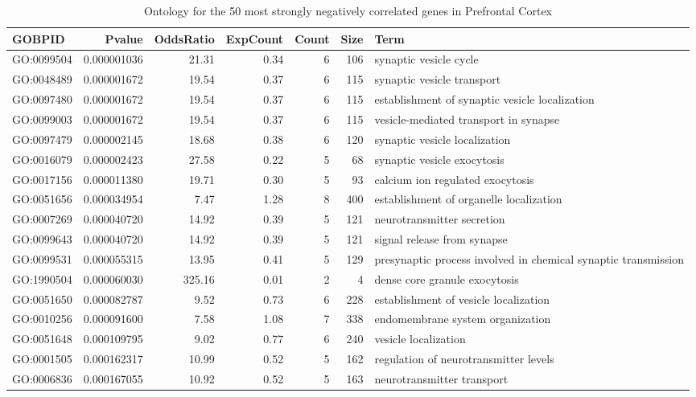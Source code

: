 \documentclass[letterpaper,12pt]{article}
\numberwithin{equation}{appendix}
\begin{document}
\noindent

\begin{landscape}
{\small {

\begin{longtable}{lrrrrrl}
\caption{Ontology for the 50 most strongly negatively correlated genes in Prefrontal Cortex} \\ 
  \toprule
GOBPID & Pvalue & OddsRatio & ExpCount & Count & Size & Term \\ 
  \midrule
GO:0099504 & 0.000001036 & 21.31 & 0.34 & 6 & 106 & synaptic vesicle cycle \\ 
  GO:0048489 & 0.000001672 & 19.54 & 0.37 & 6 & 115 & synaptic vesicle transport \\ 
  GO:0097480 & 0.000001672 & 19.54 & 0.37 & 6 & 115 & establishment of synaptic vesicle localization \\ 
  GO:0099003 & 0.000001672 & 19.54 & 0.37 & 6 & 115 & vesicle-mediated transport in synapse \\ 
  GO:0097479 & 0.000002145 & 18.68 & 0.38 & 6 & 120 & synaptic vesicle localization \\ 
  GO:0016079 & 0.000002423 & 27.58 & 0.22 & 5 & 68 & synaptic vesicle exocytosis \\ 
  GO:0017156 & 0.000011380 & 19.71 & 0.30 & 5 & 93 & calcium ion regulated exocytosis \\ 
  GO:0051656 & 0.000034954 & 7.47 & 1.28 & 8 & 400 & establishment of organelle localization \\ 
  GO:0007269 & 0.000040720 & 14.92 & 0.39 & 5 & 121 & neurotransmitter secretion \\ 
  GO:0099643 & 0.000040720 & 14.92 & 0.39 & 5 & 121 & signal release from synapse \\ 
  GO:0099531 & 0.000055315 & 13.95 & 0.41 & 5 & 129 & presynaptic process involved in chemical synaptic transmission \\ 
  GO:1990504 & 0.000060030 & 325.16 & 0.01 & 2 & 4 & dense core granule exocytosis \\ 
  GO:0051650 & 0.000082787 & 9.52 & 0.73 & 6 & 228 & establishment of vesicle localization \\ 
  GO:0010256 & 0.000091600 & 7.58 & 1.08 & 7 & 338 & endomembrane system organization \\ 
  GO:0051648 & 0.000109795 & 9.02 & 0.77 & 6 & 240 & vesicle localization \\ 
  GO:0001505 & 0.000162317 & 10.99 & 0.52 & 5 & 162 & regulation of neurotransmitter levels \\ 
  GO:0006836 & 0.000167055 & 10.92 & 0.52 & 5 & 163 & neurotransmitter transport \\ 

\end{longtable}}}
\end{landscape}
\end{document}
